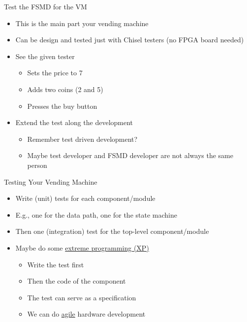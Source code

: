\begin{frame}[fragile]{Test the FSMD for the VM}
\begin{itemize}
\item This is the main part your vending machine
\item Can be design and tested just with Chisel testers (no FPGA board needed)
\item See the given tester
\begin{itemize}
\item Sets the price to 7
\item Adds two coins (2 and 5)
\item Presses the buy button
\end{itemize}
\item Extend the test along the development
\begin{itemize}
\item Remember test driven development?
\item Maybe test developer and FSMD developer are not always the same person
\end{itemize}
\end{itemize}
\end{frame}


\begin{frame}[fragile]{Testing Your Vending Machine}
\begin{itemize}
\item Write (unit) tests for each component/module
\item E.g., one for the data path, one for the state machine
\item Then one (integration) test for the top-level component/module
\item Maybe do some \href{https://en.wikipedia.org/wiki/Extreme_programming}{extreme programming (XP)}
\begin{itemize}
\item Write the test first
\item Then the code of the component
\item The test can serve as a specification
\item We can do \href{https://en.wikipedia.org/wiki/Agile_software_development}{agile} hardware development
\end{itemize}
\end{itemize}
\end{frame}

